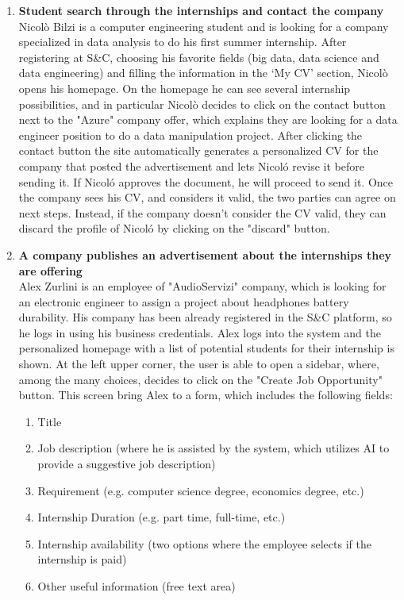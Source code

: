 \begin{enumerate}
      \item \textbf{Student search through the internships and contact the company}\\
     Nicolò Bilzi is a computer engineering student and is looking for a company specialized in data analysis to do his first summer internship. After registering at S\&C, choosing his favorite fields (big data, data science and data engineering) and filling the information in the ‘My CV’ section, Nicolò opens his homepage.
     On the homepage he can see several internship possibilities, and in particular Nicolò decides to click on the contact button next to the "Azure" company offer, which explains they are looking for a data engineer position to do a data manipulation project. After clicking the contact button the site automatically generates a personalized CV for the company that posted the advertisement and lets Nicoló revise it before sending it. If Nicoló approves the document, he will proceed to send it. Once the company sees his CV, and considers it valid, the two parties can agree on next steps. Instead, if the company doesn't consider the CV valid, they can discard the profile of Nicoló by clicking on the "discard" button.
      
      \item \textbf{A company publishes an advertisement about the internships they are offering}\\
    Alex Zurlini is an employee of "AudioServizi" company, which is looking for an electronic engineer to assign a project about headphones battery durability.
    His company has been already registered in the S\&C platform, so he logs in using his business credentials.
    Alex logs into the system and the personalized homepage with a list of potential students for their internship is shown.
    At the left upper corner, the user is able to open a sidebar, where, among the many choices, decides to click on the "Create Job Opportunity" button. 
    This screen bring Alex to a form, which includes the following fields:
    \begin{enumerate}
      \item Title 
      \item Job description (where he is assisted by the system, which utilizes AI to provide a suggestive job description)
      \item Requirement (e.g. computer science degree, economics degree, etc.)
      \item Internship Duration (e.g. part time, full-time, etc.)
      \item Internship availability (two options where the employee selects if the internship is paid)
      \item Other useful information (free text area)
    \end{enumerate}    


\end{enumerate}

